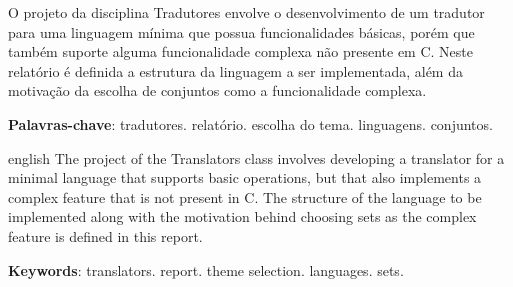 \documentclass[
	article,			%
	11pt,				%
	oneside,			%
	a4paper,			%
	english,			%
	brazil,				%
	sumario=tradicional
	]{abntex2}
\begin{document}

\frenchspacing 


%
%

\maketitle





\begin{resumoumacoluna}
   O projeto da disciplina Tradutores envolve o desenvolvimento de
   um tradutor para uma linguagem mínima que possua funcionalidades
   básicas, porém que também suporte alguma funcionalidade complexa
   não presente em C. Neste relatório é definida a estrutura da
   linguagem a ser implementada, além da motivação da escolha de
   conjuntos como a funcionalidade complexa.

 \vspace{\onelineskip}
 
 \noindent
 \textbf{Palavras-chave}: tradutores. relatório. 
 						  escolha do tema. linguagens. conjuntos.
\end{resumoumacoluna}


\renewcommand{\resumoname}{Abstract}
\begin{resumoumacoluna}
 \begin{otherlanguage*}{english}
   The project of the Translators class involves developing a
   translator for a minimal language that supports basic operations,
   but that also implements a complex feature that is not present
   in C. The structure of the language to be implemented along with
   the motivation behind choosing sets as the complex feature is
   defined in this report.	
   \vspace{\onelineskip}
 
   \noindent
   \textbf{Keywords}: translators. report. theme selection.
   					  languages. sets.
 \end{otherlanguage*}  
\end{resumoumacoluna}
\end{document}
